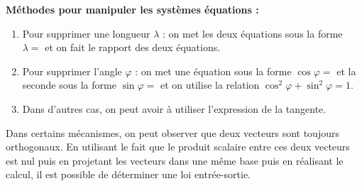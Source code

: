 \begin{methode}
\textbf{Méthodes pour manipuler les systèmes équations :} 
\begin{enumerate}
\item Pour supprimer une longueur $\lambda$ : on met les deux équations sous la forme $\lambda =$ et on fait le rapport des deux équations.
\item Pour supprimer l'angle $\varphi$ : on met une équation sous la forme $\cos\varphi = $ et la seconde sous la forme $\sin\varphi = $ et on utilise la relation $\cos^2\varphi +\sin^2\varphi =1 $.
\item Dans d'autres cas, on peut avoir à utiliser l'expression de la tangente.
\end{enumerate}
\end{methode}


\begin{methode}
Dans certains mécanismes, on peut observer que deux vecteurs sont toujours orthogonaux. En utilisant le fait que le produit scalaire entre ces deux vecteurs est nul puis en projetant les vecteurs dans une même base puis en réalisant le calcul, il est possible de déterminer une loi entrée-sortie.
\end{methode}
%


